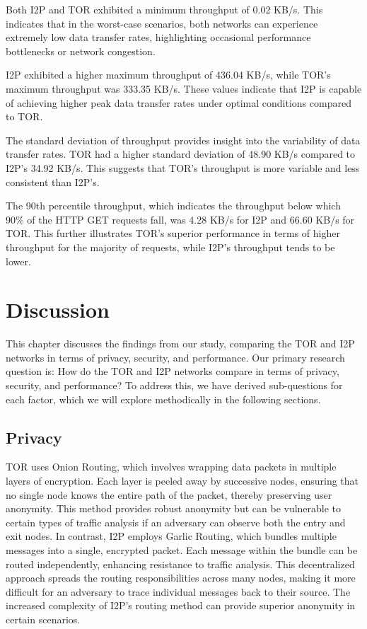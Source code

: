 \documentclass[12pt,conference]{IEEEtran}
\begin{document}
Both I2P and TOR exhibited a minimum throughput of 0.02 KB/s. This indicates that in the worst-case scenarios, both networks can experience extremely low data transfer rates, highlighting occasional performance bottlenecks or network congestion.

I2P exhibited a higher maximum throughput of 436.04 KB/s, while TOR's maximum throughput was 333.35 KB/s. These values indicate that I2P is capable of achieving higher peak data transfer rates under optimal conditions compared to TOR.

The standard deviation of throughput provides insight into the variability of data transfer rates. TOR had a higher standard deviation of 48.90 KB/s compared to I2P's 34.92 KB/s. This suggests that TOR's throughput is more variable and less consistent than I2P's.

The 90th percentile throughput, which indicates the throughput below which 90\% of the HTTP GET requests fall, was 4.28 KB/s for I2P and 66.60 KB/s for TOR. This further illustrates TOR's superior performance in terms of higher throughput for the majority of requests, while I2P's throughput tends to be lower.
\section{Discussion}
This chapter discusses the findings from our study, comparing the TOR and I2P networks in terms of privacy, security, and performance. Our primary research question is: How do the TOR and I2P networks compare in terms of privacy, security, and performance? To address this, we have derived sub-questions for each factor, which we will explore methodically in the following sections.

\subsection{Privacy}
TOR uses Onion Routing, which involves wrapping data packets in multiple layers of encryption. Each layer is peeled away by successive nodes, ensuring that no single node knows the entire path of the packet, thereby preserving user anonymity. This method provides robust anonymity but can be vulnerable to certain types of traffic analysis if an adversary can observe both the entry and exit nodes. In contrast, I2P employs Garlic Routing, which bundles multiple messages into a single, encrypted packet. Each message within the bundle can be routed independently, enhancing resistance to traffic analysis. This decentralized approach spreads the routing responsibilities across many nodes, making it more difficult for an adversary to trace individual messages back to their source. The increased complexity of I2P’s routing method can provide superior anonymity in certain scenarios.
\end{document}

